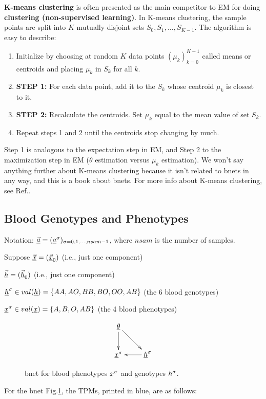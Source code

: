 {\bf K-means clustering} is often
presented as the main competitor
to EM for doing
{\bf clustering (non-supervised
learning)}. In K-means clustering,
the sample points are
split into $K$
mutually
disjoint sets $S_0, S_1, \ldots, S_{K-1}$.
The algorithm is easy
to describe:
\begin{enumerate}
\item
Initialize by
choosing  at random
$K$ data points $(\mu_k)_{k=0}^{K-1}$
called means or centroids
and placing $\mu_k$ in $S_k$
for all $k$.
 \item {\bf STEP 1:}
For each data point,
add it to the $S_k$
whose centroid $\mu_k$
is closest to it.
\item {\bf STEP 2:}
Recalculate the centroids.
Set $\mu_k$ equal to the mean value of set
$S_k$.
\item Repeat steps 1 and 2 until the
centroids stop changing
by much.
\end{enumerate}
Step 1 is analogous
to the expectation step in EM,
and Step 2 to the maximization
step in EM ($\theta$
estimation versus
$\mu_k$ estimation).
We won't say anything further
about K-means clustering because
it
isn't related to bnets in any
way, and this is a book about bnets.
For more info about
K-means clustering,
see Ref.\cite{wiki-k-means}.

\subsection{Blood Genotypes
and Phenotypes}

Notation:
$\vec{\rva}=
(\rva^\s)_{\sigma=0, 1, \ldots,nsam-1}
$, where $nsam$
is the number of samples.


Suppose
$\vec{\rvx}=
(\vec{\rvx}_0)
$ (i.e., just one component)

$\vec{\rvh}=
(\vec{\rvh}_0)
$ (i.e., just one component)



$\rvh^\s\in val(\rvh)=
\{AA, AO, BB, BO, OO, AB\}$ (the 6 blood genotypes)

$\rvx^\s\in val(\rvx)=
\{A,B,O,AB\}$ (the 4 blood phenotypes)

\begin{figure}[h!]
$$
\xymatrix{
\ul{\theta}\ar[d]\ar[dr]
\\
\rvx^\s&\rvh^\s\ar[l]
}$$
\caption{bnet
for blood phenotypes $x^\sigma$
and genotypes $h^\sigma$.}
\label{fig-phenotypes}
\end{figure}

For the bnet Fig.\ref{fig-phenotypes},
the TPMs, printed in blue, are as follows:

